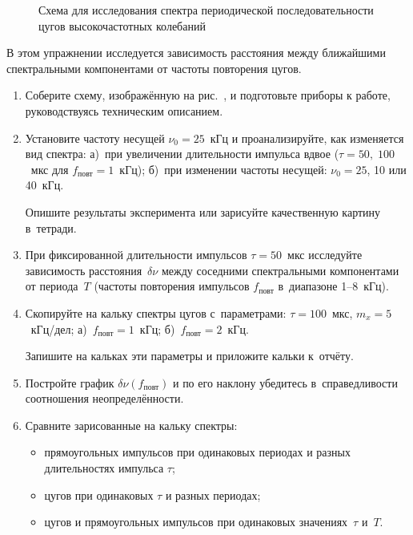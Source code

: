 \begin{figure}[h!]
	\centering
	\caption{Схема для исследования спектра периодической последовательности цугов высокочастотных колебаний}
\end{figure}

\begin{lab:task}

В этом упражнении исследуется зависимость расстояния между ближайшими спектральными компонентами от частоты повторения цугов.

\begin{enumerate}
	\item Соберите схему, изображённую на рис.~, и подготовьте приборы к работе, руководствуясь техническим описанием.
	\item Установите частоту несущей $\nu_0=25$~кГц и проанализируйте, как изменяется вид спектра: а)~при увеличении длительности импульса вдвое ($\tau=50,\;100$~мкс для $f_\text{повт}=1$~кГц); б)~при изменении частоты несущей: $\nu_0=25$, 10 или 40~кГц.

	Опишите результаты эксперимента или зарисуйте качественную картину в~тетради.
	\item При фиксированной длительности импульсов $\tau=50$~мкс исследуйте зависимость расстояния~$\delta \nu$ между соседними спектральными компонентами от периода~$T$ (частоты повторения импульсов $f_\text{повт}$ в~диапазоне 1--8~кГц).
	\item Скопируйте на кальку спектры цугов с~параметрами: $\tau=100$~мкс, $m_x=5$~кГц/дел; а)~$f_\text{повт}=1$~кГц; б)~$f_\text{повт}=2$~кГц.

	Запишите на кальках эти параметры и приложите кальки к~отчёту.

	\item Постройте график $\delta \nu(f_\text{повт})$ и по его наклону убедитесь в~справедливости соотношения неопределённости.
	\item Сравните зарисованные на кальку спектры:
	\begin{itemize}
		\item прямоугольных импульсов при одинаковых периодах и разных длительностях импульса $\tau$;
		\item цугов при одинаковых $\tau$ и разных периодах;
		\item цугов и прямоугольных импульсов при одинаковых значениях~$\tau$ и~$T$.
	\end{itemize}

\end{enumerate}

\end{lab:task}


